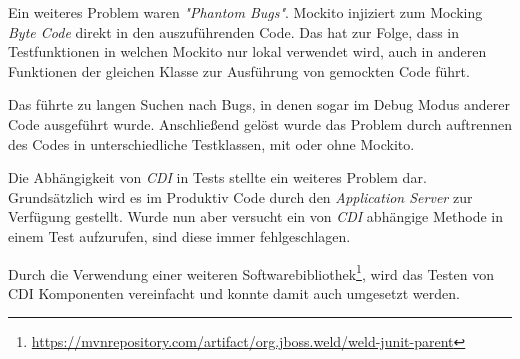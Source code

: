 Ein weiteres Problem waren \emph{"Phantom Bugs"}. Mockito injiziert zum Mocking \emph{Byte Code} direkt in den auszuführenden Code. Das hat zur Folge, dass in Testfunktionen in welchen Mockito nur lokal verwendet wird, auch
in anderen Funktionen der gleichen Klasse zur Ausführung von gemockten Code führt.

Das führte zu langen Suchen nach Bugs, in denen sogar im Debug Modus anderer Code ausgeführt wurde. Anschließend gelöst wurde das Problem durch auftrennen des Codes in unterschiedliche Testklassen, mit oder ohne Mockito.\newline

Die Abhängigkeit von \emph{CDI} in Tests stellte ein weiteres Problem dar. Grundsätzlich wird es im Produktiv Code durch den \emph{Application Server} zur Verfügung gestellt. Wurde nun aber versucht ein von \emph{CDI} abhängige Methode in einem Test aufzurufen, sind diese immer fehlgeschlagen.

Durch die Verwendung einer weiteren Softwarebibliothek\footnote{\url{https://mvnrepository.com/artifact/org.jboss.weld/weld-junit-parent}}, wird das Testen von CDI Komponenten vereinfacht und konnte damit auch umgesetzt werden.
